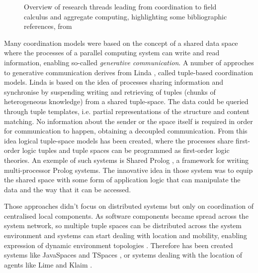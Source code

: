 \begin{figure}
\caption{Overview of research threads leading from coordination to field calculus and aggregate computing, highlighting some bibliographic references, from \cite{Survey}}
\label{fig:past-summary} 
\end{figure}

Many coordination models were based on the concept of a shared data space where the processes of a parallel computing system can write and read information, enabling so-called \textit{generative communication}. A number of approches to generative communication derives from Linda \cite{Linda}, called tuple-based coordination models. Linda is based on the idea of processes sharing information and synchronise by suspending writing and retrieving of tuples (chunks of heterogeneous knowledge) from a shared tuple-space. The data could be queried through tuple templates, i.e. partial representations of the structure and content matching. No information about the sender or the space itself is required in order for communication to happen, obtaining a decoupled communication. From this idea logical tuple-space models has been created, where the processes share first-order logic tuples and tuple spaces can be programmed as first-order logic theories. An exemple of such systems is Shared Prolog \cite{SharedProlog}, a framework for writing multi-processor Prolog systems. The innovative idea in those system was to equip the shared space with some form of application logic that can manipulate the data and the way that it can be accessed.

Those approaches didn't focus on distributed systems but only on coordination of centralised local components. As software components became spread across the system network, so multiple tuple spaces can be distributed across the system environment and systems can start dealing with location and mobility, enabling expression of dynamic environment topologies \cite{Survey}. Therefore has been created systems like JavaSpaces \cite{freeman1999javaspaces} and TSpaces \cite{TSpaces}, or systems dealing with the location of agents like Lime \cite{Lime} and Klaim \cite{Klaim}.

